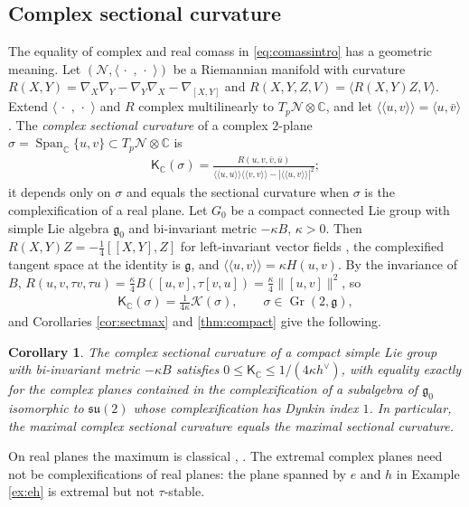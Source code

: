 \documentclass[leqno,10pt]{amsart}
\newtheorem{corollary}[theorem]{Corollary}%
\theoremstyle{definition}
\numberwithin{equation}{section}
\newcommand{\grass}{\operatorname{Gr}}
\newcommand{\sect}{\mathscr{K}}
\newcommand{\dum}{\,\cdot\,\,}
\newcommand{\spn}{\operatorname{Span}}
\newcommand{\su}{\mathfrak{su}}
\newcommand{\g}{\mathfrak{g}}
\newcommand{\com}{\mathbb C}
\newcommand{\gz}{\g_{0}}
\newcommand{\hv}{h^\vee}
\newcommand{\norm}[1]{\lVert #1\rVert}
\begin{document}
\subsection{Complex sectional curvature}\label{sec:curvature}
The equality of complex and real comass in \eqref{eq:comassintro} has a geometric meaning. Let $(\mathcal{N}, \langle\dum, \dum\rangle)$ be a Riemannian manifold with curvature $R(X, Y) = \nabla_{X}\nabla_{Y} - \nabla_{Y}\nabla_{X} - \nabla_{[X, Y]}$ and $R(X, Y, Z, V) = \langle R(X, Y)Z, V\rangle$. Extend $\langle\dum, \dum\rangle$ and $R$ complex multilinearly to $T_{p}\mathcal{N} \otimes \com$, and let $\langle\langle u, v\rangle\rangle = \langle u, \bar{v}\rangle$. The \emph{complex sectional curvature} of a complex $2$-plane $\sigma = \spn_{\com}\{u, v\} \subset T_{p}\mathcal{N} \otimes \com$ is \cite{Micallef-Moore}
\begin{align}\label{eq:complexsectional}
\mathsf{K}_{\com}(\sigma) = \frac{R(u, v, \bar{v}, \bar{u})}{\langle\langle u, u\rangle\rangle\langle\langle v, v\rangle\rangle - |\langle\langle u, v\rangle\rangle|^{2}};
\end{align}
it depends only on $\sigma$ and equals the sectional curvature when $\sigma$ is the complexification of a real plane. Let $G_{0}$ be a compact connected Lie group with simple Lie algebra $\gz$ and bi-invariant metric $-\kappa B$, $\kappa > 0$. Then $R(X, Y)Z = -\tfrac{1}{4}[[X, Y], Z]$ for left-invariant vector fields \cite{Helgason}, the complexified tangent space at the identity is $\g$, and $\langle\langle u, v\rangle\rangle = \kappa H(u, v)$. By the invariance of $B$, $R(u, v, \tau v, \tau u) = \tfrac{\kappa}{4}B([u, v], \tau[v, u]) = \tfrac{\kappa}{4}\norm{[u, v]}^{2}$, so
\begin{align}\label{eq:KCgroup}
\mathsf{K}_{\com}(\sigma) = \frac{1}{4\kappa}\sect(\sigma), \qquad \sigma \in \grass(2, \g),
\end{align}
and Corollaries \ref{cor:sectmax} and \ref{thm:compact} give the following.
\begin{corollary}\label{cor:groupcurvature}
The complex sectional curvature of a compact simple Lie group with bi-invariant metric $-\kappa B$ satisfies $0 \leq \mathsf{K}_{\com} \leq 1/(4\kappa\hv)$, with equality exactly for the complex planes contained in the complexification of a subalgebra of $\gz$ isomorphic to $\su(2)$ whose complexification has Dynkin index $1$. In particular, the maximal complex sectional curvature equals the maximal sectional curvature.
\end{corollary}
On real planes the maximum is classical \cite[p.~334, Theorem~11.1]{Helgason-dgls}, \cite{Liu-curvatureestimates}. The extremal complex planes need not be complexifications of real planes: the plane spanned by $e$ and $h$ in Example \ref{ex:eh} is extremal but not $\tau$-stable.
\end{document}
